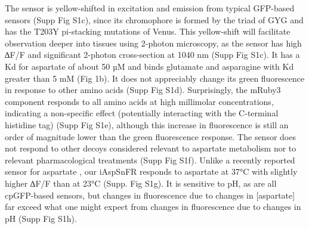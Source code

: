 \documentclass[9pt,lineno]{elife}
\begin{document}
The sensor is yellow-shifted in excitation and emission from typical GFP-based sensors (Supp Fig S1c), since its chromophore is formed by the triad of GYG and has the T203Y pi-stacking mutations of Venus.
This yellow-shift will facilitate observation deeper into tissues using 2-photon microscopy, as the sensor has high ∆F/F and significant 2-photon cross-section at 1040 nm (Supp Fig S1c).
It has a Kd for aspartate of about 50 µM and binds glutamate and asparagine with Kd greater than 5 mM (Fig 1b). It does not appreciably change its green fluorescence in response to other amino acids (Supp Fig S1d).
Surprisingly, the mRuby3 component responds to all amino acids at high millimolar concentrations, indicating a non-specific effect (potentially interacting with the C-terminal histidine tag) (Supp Fig S1e), although this increase in fluorescence is still an order of magnitude lower than the green fluorescence response.
The sensor does not respond to other decoys considered relevant to aspartate metabolism nor to relevant pharmacological treatments (Supp Fig S1f). Unlike a recently reported sensor for aspartate \citep{Hellweg2023}, our iAspSnFR responds to aspartate at 37°C with slightly higher ∆F/F than at 23°C (Supp. Fig S1g).
It is sensitive to pH, as are all cpGFP-based sensors, but changes in fluorescence due to changes in [aspartate] far exceed what one might expect from changes in fluorescence due to changes in pH (Supp Fig S1h).
\end{document}
